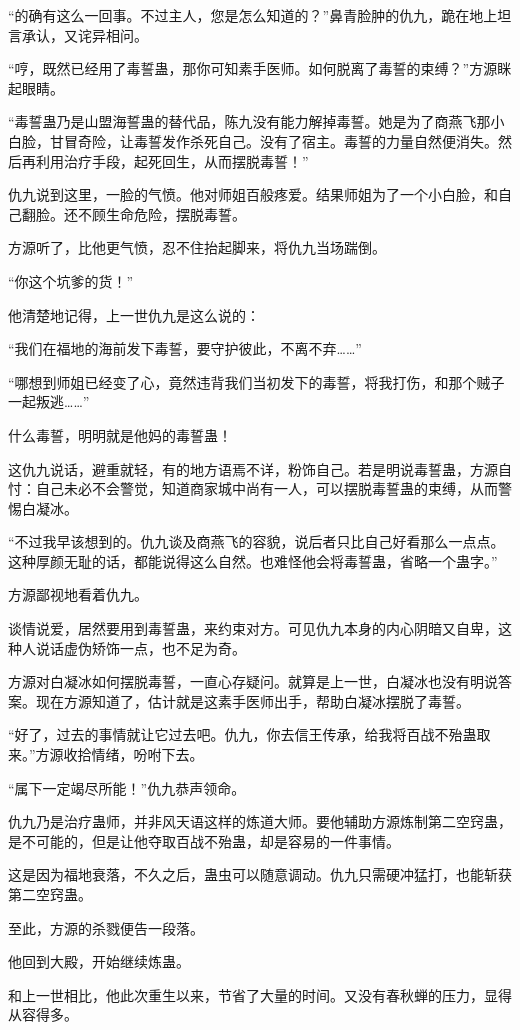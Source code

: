 \begin{this_body}
“的确有这么一回事。不过主人，您是怎么知道的？”鼻青脸肿的仇九，跪在地上坦言承认，又诧异相问。

“哼，既然已经用了毒誓蛊，那你可知素手医师。如何脱离了毒誓的束缚？”方源眯起眼睛。

“毒誓蛊乃是山盟海誓蛊的替代品，陈九没有能力解掉毒誓。她是为了商燕飞那小白脸，甘冒奇险，让毒誓发作杀死自己。没有了宿主。毒誓的力量自然便消失。然后再利用治疗手段，起死回生，从而摆脱毒誓！”

仇九说到这里，一脸的气愤。他对师姐百般疼爱。结果师姐为了一个小白脸，和自己翻脸。还不顾生命危险，摆脱毒誓。

方源听了，比他更气愤，忍不住抬起脚来，将仇九当场踹倒。

“你这个坑爹的货！”

他清楚地记得，上一世仇九是这么说的：

“我们在福地的海前发下毒誓，要守护彼此，不离不弃……”

“哪想到师姐已经变了心，竟然违背我们当初发下的毒誓，将我打伤，和那个贼子一起叛逃……”

什么毒誓，明明就是他妈的毒誓蛊！

这仇九说话，避重就轻，有的地方语焉不详，粉饰自己。若是明说毒誓蛊，方源自忖：自己未必不会警觉，知道商家城中尚有一人，可以摆脱毒誓蛊的束缚，从而警惕白凝冰。

“不过我早该想到的。仇九谈及商燕飞的容貌，说后者只比自己好看那么一点点。这种厚颜无耻的话，都能说得这么自然。也难怪他会将毒誓蛊，省略一个蛊字。”

方源鄙视地看着仇九。

谈情说爱，居然要用到毒誓蛊，来约束对方。可见仇九本身的内心阴暗又自卑，这种人说话虚伪矫饰一点，也不足为奇。

方源对白凝冰如何摆脱毒誓，一直心存疑问。就算是上一世，白凝冰也没有明说答案。现在方源知道了，估计就是这素手医师出手，帮助白凝冰摆脱了毒誓。

“好了，过去的事情就让它过去吧。仇九，你去信王传承，给我将百战不殆蛊取来。”方源收拾情绪，吩咐下去。

“属下一定竭尽所能！”仇九恭声领命。

仇九乃是治疗蛊师，并非风天语这样的炼道大师。要他辅助方源炼制第二空窍蛊，是不可能的，但是让他夺取百战不殆蛊，却是容易的一件事情。

这是因为福地衰落，不久之后，蛊虫可以随意调动。仇九只需硬冲猛打，也能斩获第二空窍蛊。

至此，方源的杀戮便告一段落。

他回到大殿，开始继续炼蛊。

和上一世相比，他此次重生以来，节省了大量的时间。又没有春秋蝉的压力，显得从容得多。


\end{this_body}
